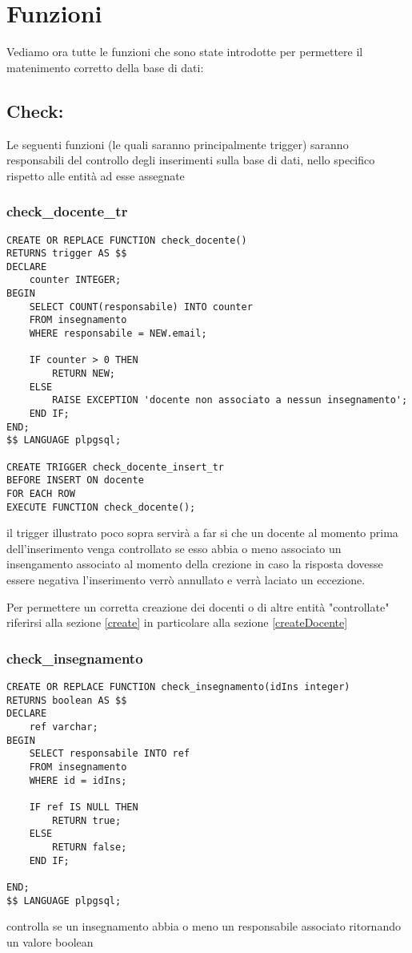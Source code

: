 \section{Funzioni}\label{funzioni}
Vediamo ora tutte le funzioni che sono state introdotte per permettere il matenimento corretto della base di dati:
\subsection{Check:}
Le seguenti funzioni (le quali saranno principalmente trigger) saranno responsabili  del controllo degli inserimenti sulla base di dati, nello specifico rispetto alle entità ad esse assegnate
\subsubsection{check\_docente\_tr}\label{checkdocentetr}
\begin{lstlisting}[style=sqlStyle]
CREATE OR REPLACE FUNCTION check_docente()
RETURNS trigger AS $$
DECLARE
    counter INTEGER;
BEGIN 
    SELECT COUNT(responsabile) INTO counter
    FROM insegnamento
    WHERE responsabile = NEW.email;

    IF counter > 0 THEN
        RETURN NEW;
    ELSE
        RAISE EXCEPTION 'docente non associato a nessun insegnamento'; 
    END IF;
END;
$$ LANGUAGE plpgsql;

CREATE TRIGGER check_docente_insert_tr
BEFORE INSERT ON docente
FOR EACH ROW 
EXECUTE FUNCTION check_docente();

\end{lstlisting}
il trigger illustrato poco sopra servirà a far si che un docente al momento prima dell'inserimento venga controllato  se esso abbia o meno  associato un insengamento  associato al momento della crezione in caso la risposta dovesse essere negativa l'inserimento verrò annullato e verrà laciato un eccezione.

Per permettere un corretta creazione dei docenti o di altre entità "controllate" riferirsi alla sezione \ref{create}  in particolare alla sezione \ref{createDocente}

\subsubsection{check\_insegnamento}\label{checkinsegnamento}
\begin{lstlisting}[style=sqlStyle]
CREATE OR REPLACE FUNCTION check_insegnamento(idIns integer)
RETURNS boolean AS $$
DECLARE
    ref varchar;
BEGIN 
    SELECT responsabile INTO ref
    FROM insegnamento 
    WHERE id = idIns;

    IF ref IS NULL THEN
        RETURN true;
    ELSE
        RETURN false;
    END IF;
    
END;
$$ LANGUAGE plpgsql;
\end{lstlisting}
controlla  se un insegnamento abbia o meno un responsabile associato ritornando un valore boolean
